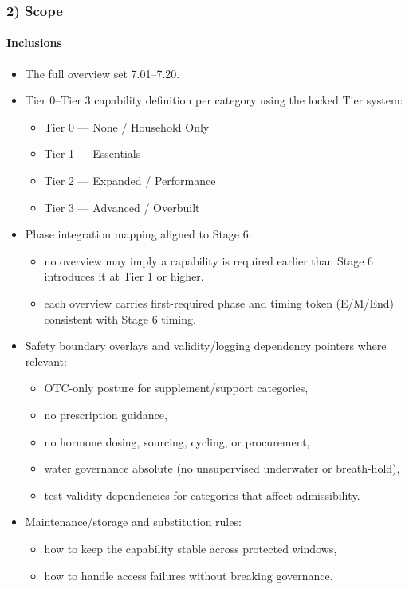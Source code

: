 \documentclass[10pt]{article}
\begin{document}
\subsubsection*{2) Scope}

\paragraph*{Inclusions}

\begin{itemize}
\item The full overview set 7.01–7.20.
\item Tier 0–Tier 3 capability definition per category using the locked Tier system:
  \begin{itemize}
  \item Tier 0 — None / Household Only
  \item Tier 1 — Essentials
  \item Tier 2 — Expanded / Performance
  \item Tier 3 — Advanced / Overbuilt
  \end{itemize}
\item Phase integration mapping aligned to Stage 6:
  \begin{itemize}
  \item no overview may imply a capability is required earlier than Stage 6 introduces it at Tier 1 or higher.
  \item each overview carries first-required phase and timing token (E/M/End) consistent with Stage 6 timing.
  \end{itemize}
\item Safety boundary overlays and validity/logging dependency pointers where relevant:
  \begin{itemize}
  \item OTC-only posture for supplement/support categories,
  \item no prescription guidance,
  \item no hormone dosing, sourcing, cycling, or procurement,
  \item water governance absolute (no unsupervised underwater or breath-hold),
  \item test validity dependencies for categories that affect admissibility.
  \end{itemize}
\item Maintenance/storage and substitution rules:
  \begin{itemize}
  \item how to keep the capability stable across protected windows,
  \item how to handle access failures without breaking governance.
  \end{itemize}
\end{itemize}
\end{document}
